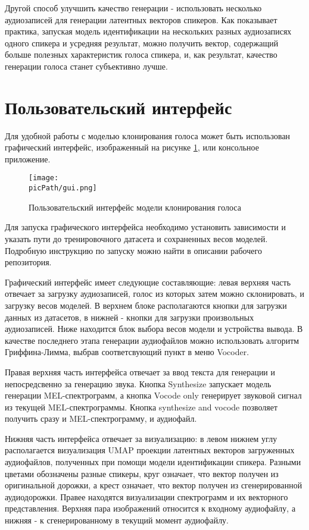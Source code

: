 \documentclass[oneside,final,14pt]{extreport}
\newcommand{\picPath}{pictures}
\begin{document}
Другой способ улучшить качество генерации - использовать несколько аудиозаписей для генерации латентных векторов спикеров. Как показывает практика, запуская модель идентификации на нескольких разных аудиозаписях одного спикера и усредняя результат, можно получить вектор, содержащий больше полезных характеристик голоса спикера, и, как результат, качество генерации голоса станет субъективно лучше.

\section{Пользовательский интерфейс}
Для удобной работы с моделью клонирования голоса может быть использован графический интерфейс, изображенный на рисунке \ref{pic:gui}, или консольное приложение. 
\iffalse Кроме того, с развернутой в облаке моделью можно взаимодействовать через телеграм бота, описаного ниже. 
\fi
\begin{figure}[H]
\begin{center}
\texttt{[image: \\picPath/gui.png]}
\end{center}
  \caption{Пользовательский интерфейс модели клонирования голоса}
  \label{pic:gui}
\end{figure}

Для запуска графического интерфейса необходимо установить зависимости и указать пути до тренировочного датасета и сохраненных весов моделей. Подробную инструкцию по запуску можно найти в описании рабочего репозитория.

Графический интерфейс имеет следующие составляющие: левая верхняя часть  отвечает за загрузку аудиозаписей, голос из которых затем можно склонировать, и загрузку весов моделей. В верхнем блоке располагаются кнопки для загрузки данных из датасетов, в нижней - кнопки для загрузки произвольных аудиозаписей. Ниже находится блок выбора весов модели и устройства вывода. В качестве последнего этапа генерации аудиофайлов можно использовать алгоритм Гриффина-Лимма, выбрав соответсвующий пункт в меню Vocoder.

Правая верхняя часть интерфейса отвечает за ввод текста для генерации и непосредсвенно за генерацию звука. Кнопка Synthesize запускает модель генерации MEL-спектрограмм, а кнопка Vocode only генерирует звуковой сигнал из текущей MEL-спектрограммы. Кнопка synthesize and vocode позволяет получить сразу и MEL-спектрограмму, и аудиофайл.

Нижняя часть интерфейса отвечает за визуализацию: в левом нижнем углу располагается визуализация UMAP проекции\cite{bib:umap} латентных векторов загруженных аудиофайлов, полученных при помощи модели идентификации спикера. Разными цветами обозначены разные спикеры, круг означает, что вектор получен из оригинальной дорожки, а крест означает, что вектор получен из сгенерированной аудиодорожки. Правее находятся визуализации спектрограмм и их векторного представления. Верхняя пара изображений относится к входному аудиофайлу, а нижняя -  к сгенерированному в текущий момент аудиофайлу. 
\end{document}
